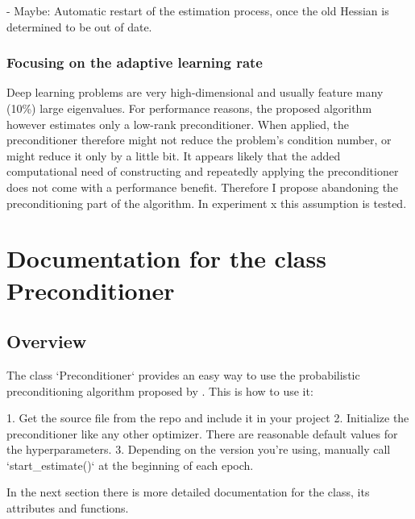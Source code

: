 \documentclass[twoside,12pt,a4paper]{report}
\begin{document}
- Maybe: Automatic restart of the estimation process, once the old Hessian is determined to be out of date.

\subsubsection{Focusing on the adaptive learning rate}
Deep learning problems are very high-dimensional and usually feature many (10\%) 
large eigenvalues. For performance reasons, the proposed algorithm however estimates only a low-rank preconditioner. When applied, the preconditioner therefore might not reduce the problem's condition number, or might reduce it only by a little bit. It appears likely that the added computational need of constructing and repeatedly applying the preconditioner does not come with a performance benefit. Therefore I propose abandoning the preconditioning part of the algorithm. In experiment x  this assumption is tested.

\section{Documentation for the class Preconditioner}
\subsection{Overview}
\begin{markdown}
The class `Preconditioner` provides an easy way to use the probabilistic preconditioning algorithm proposed by \cite{roos2019active}.
This is how to use it:

1. Get the source file from the repo and include it in your project
2. Initialize the preconditioner like any other optimizer. There are reasonable default values for the hyperparameters.
3. Depending on the version you're using, manually call `start_estimate()` at the beginning of each epoch.

In the next section there is more detailed documentation for the class, its attributes and functions.
\end{markdown}
\end{document}
